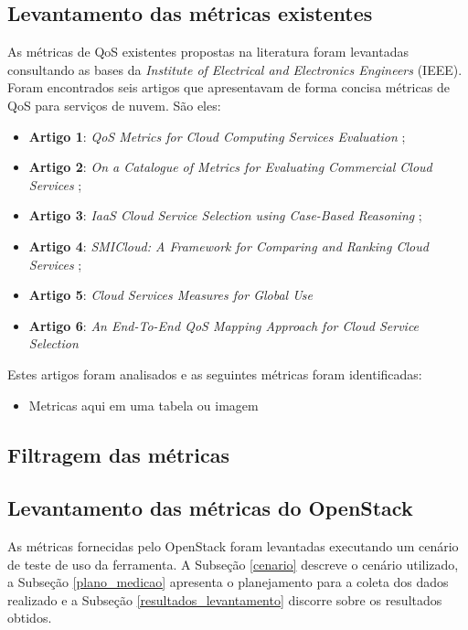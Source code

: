 \documentclass[conference]{IEEEtran}
\begin{document}
  \subsection{Levantamento das métricas existentes}
      
      As métricas de QoS existentes propostas na literatura foram levantadas consultando as bases da
      \textit{Institute of Electrical and Electronics Engineers} (IEEE). Foram encontrados seis artigos que apresentavam de forma concisa
      métricas de QoS para serviços de nuvem. São eles:
      
      \begin{itemize}
       \item \textbf{Artigo 1}: \textit{QoS Metrics for Cloud Computing Services Evaluation} \cite{bardsiri2014};
       \item \textbf{Artigo 2}: \textit{On a Catalogue of Metrics for Evaluating Commercial Cloud Services} \cite{li2012};
       \item \textbf{Artigo 3}: \textit{IaaS Cloud Service Selection using Case-Based Reasoning} \cite{soltani2016};
       \item \textbf{Artigo 4}: \textit{SMICloud: A Framework for Comparing and Ranking Cloud Services} \cite{garg2011};
       \item \textbf{Artigo 5}: \textit{Cloud Services Measures for Global Use} \cite{siegel2012cloud}
       \item \textbf{Artigo 6}: \textit{An End-To-End QoS Mapping Approach for Cloud Service Selection} \cite{karim2013}
      \end{itemize}
     
      
      Estes artigos foram analisados e as seguintes métricas foram identificadas:
      
     \begin{itemize}
      \item Metricas aqui em uma tabela ou imagem
     \end{itemize}
     
  \subsection{Filtragem das métricas}
  
  \subsection{Levantamento das métricas do OpenStack}
  
    As métricas fornecidas pelo OpenStack foram levantadas executando um cenário de teste de uso da ferramenta. 
    A Subseção \ref{cenario} descreve o cenário utilizado, a Subseção \ref{plano_medicao} apresenta o planejamento para a
    coleta dos dados realizado e a Subseção \ref{resultados_levantamento} discorre sobre os resultados obtidos.
  
\end{document}
